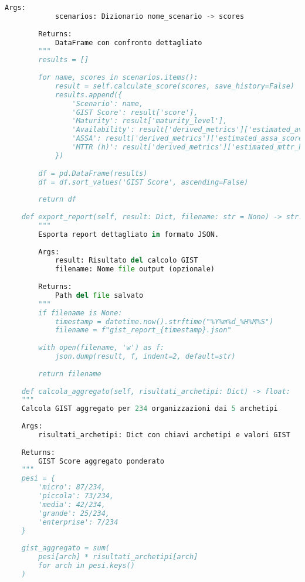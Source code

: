 \begin{lstlisting}[language=Python, caption={Implementazione completa GIST Calculator con validazione e reporting}]
        Args:
            scenarios: Dizionario nome_scenario -> scores
            
        Returns:
            DataFrame con confronto dettagliato
        """
        results = []
        
        for name, scores in scenarios.items():
            result = self.calculate_score(scores, save_history=False)
            results.append({
                'Scenario': name,
                'GIST Score': result['score'],
                'Maturity': result['maturity_level'],
                'Availability': result['derived_metrics']['estimated_availability'],
                'ASSA': result['derived_metrics']['estimated_assa_score'],
                'MTTR (h)': result['derived_metrics']['estimated_mttr_hours']
            })
        
        df = pd.DataFrame(results)
        df = df.sort_values('GIST Score', ascending=False)
        
        return df
    
    def export_report(self, result: Dict, filename: str = None) -> str:
        """
        Esporta report dettagliato in formato JSON.
        
        Args:
            result: Risultato del calcolo GIST
            filename: Nome file output (opzionale)
            
        Returns:
            Path del file salvato
        """
        if filename is None:
            timestamp = datetime.now().strftime("%Y%m%d_%H%M%S")
            filename = f"gist_report_{timestamp}.json"
        
        with open(filename, 'w') as f:
            json.dump(result, f, indent=2, default=str)
        
        return filename
    
    def calcola_aggregato(self, risultati_archetipi: Dict) -> float:
    """
    Calcola GIST aggregato per 234 organizzazioni dai 5 archetipi
    
    Args:
        risultati_archetipi: Dict con chiavi archetipi e valori GIST
        
    Returns:
        GIST Score aggregato ponderato
    """
    pesi = {
        'micro': 87/234,
        'piccola': 73/234,
        'media': 42/234,
        'grande': 25/234,
        'enterprise': 7/234
    }
    
    gist_aggregato = sum(
        pesi[arch] * risultati_archetipi[arch]
        for arch in pesi.keys()
    )
    

\end{lstlisting}

